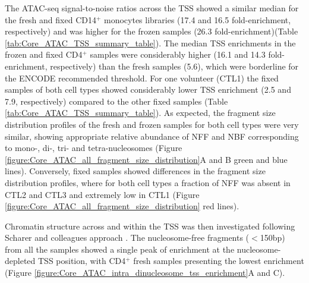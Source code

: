 The ATAC-seq signal-to-noise ratios across the TSS showed a similar median for the fresh and fixed CD14$^+$ monocytes libraries (17.4 and 16.5 fold-enrichment, respectively) and was higher for the frozen samples (26.3 fold-enrichment)(Table \ref{tab:Core_ATAC_TSS_summary_table}). The median TSS enrichments in the frozen and fixed CD4$^+$ samples were considerably higher (16.1 and 14.3 fold-enrichment, respectively) than the fresh samples (5.6), which were borderline for the ENCODE recommended threshold. For one volunteer (CTL1) the fixed samples of both cell types showed considerably lower TSS enrichment (2.5 and 7.9, respectively) compared to the other fixed samples (Table \ref{tab:Core_ATAC_TSS_summary_table}). As expected, the fragment size distribution profiles of the fresh and frozen samples for both cell types were very similar, showing appropriate relative abundance of NFF and NBF corresponding to mono-, di-, tri- and tetra-nucleosomes (Figure \ref{figure:Core_ATAC_all_fragment_size_distribution}A and B green and blue lines). Conversely, fixed samples showed differences in the fragment size distribution profiles, where for both cell types a fraction of NFF was absent in CTL2 and CTL3 and extremely low in CTL1 (Figure \ref{figure:Core_ATAC_all_fragment_size_distribution} red lines). 


Chromatin structure across and within the TSS was then investigated following Scharer and colleagues approach \parencite{Scharer2016}. The nucleosome-free fragments ($<$150bp) from all the samples showed a single peak of enrichment at the nucleosome-depleted TSS position, with CD4$^+$ fresh samples presenting the lowest enrichment (Figure \ref{figure:Core_ATAC_intra_dinucleosome_tss_enrichment}A and C).

